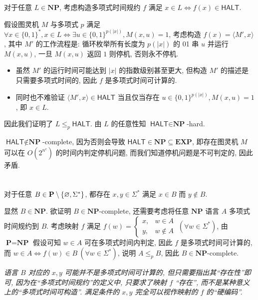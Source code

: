 \documentclass[8pt]{article}
\theoremstyle{compact}
\def\le{\leqslant}
\begin{document}
对于任意 $L \in \mathbf{NP}$, 考虑构造多项式时间规约 $f$ 满足 $x \in L \Leftrightarrow f(x) \in \textsf{HALT}$.

假设图灵机 $M$ 与多项式 $p$ 满足 $\forall x \in \{0, 1\}^*, x \in L \Leftrightarrow \exists u \in \{0, 1\}^{p(|x|)}, M(x, u) = 1$, 考虑构造 $f(x) = \langle M', x \rangle$, 其中 $M'$ 的工作流程是: 循环枚举所有长度为 $p(|x|)$ 的 01 串 $u$ 并运行 $M(x, u)$, 一旦 $M(x, u)$ 返回 $1$ 则停机, 否则永不停机.
\begin{itemize}
	\item 虽然 $M'$ 的运行时间可能达到 $|x|$ 的指数级别甚至更大, 但构造 $M'$ 的描述是只需要多项式时间的, 因此 $f$ 是多项式时间可计算的.
	\item 同时也不难验证 $\langle M', x \rangle \in \textsf{HALT}$ 当且仅当存在 $u \in \{0, 1\}^{p(|x|)}, M(x, u) = 1$, 即 $x \in L$. 
\end{itemize}

因此我们证明了 $L \le_p \textsf{HALT}$. 由 $L$ 的任意性知 $\textsf{HALT} \in \textbf{NP}$-hard.

$\textsf{HALT} \notin \textbf{NP}$-complete, 因为否则会导致 $\textsf{HALT} \in \textbf{NP} \subseteq \textbf{EXP}$, 即存在图灵机 $M$ 可以在 $O(2^{n^c})$ 的时间内判定停机问题, 而我们知道停机问题是不可判定的, 因此矛盾.

\section{}

对于任意 $B \in \textbf P \setminus \{\varnothing, \Sigma^*\}$, 都存在 $x, y \in \Sigma^*$ 满足 $x \in B$ 而 $y \notin B$.

显然 $B \in \textbf{NP}$. 欲证明 $B \in \textbf{NP}$-complete, 还需要考虑将任意 $\textbf{NP}$ 语言 $A$ 多项式时间规约到 $B$. 考虑映射 $f$ 满足 $f(w) = \begin{cases}
	x, & w \in A \\ y, & w \notin A
\end{cases} \ (\forall w \in \Sigma^*)$, 由 $\textbf{P} = \textbf{NP}$ 假设可知 $w \in A$ 可在多项式时间内判定, 因此 $f$ 是多项式时间可计算的, 而 $w \in A \Leftrightarrow f(w) \in B \ (\forall w \in \Sigma^*)$, 说明 $A \le_p B$, 因此 $B \in \textbf{NP}$-complete.

\textit{语言 $B$ 对应的 $x, y$ 可能并不是多项式时间可计算的, 但只需要指出其“存在性”即可, 因为在“多项式时间规约”的定义中, 只要求了映射 $f$ “存在”, 而不是某种意义上的“多项式时间可构造”. 满足条件的 $x, y$ 完全可以视作映射的 $f$ 的“硬编码”.}
\end{document}
